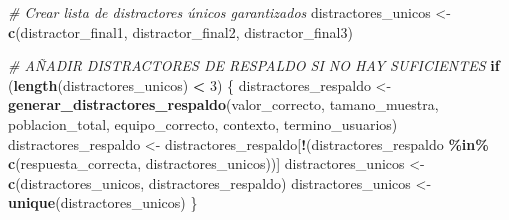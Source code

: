 \documentclass[
]{article}
\newenvironment{Shaded}{\begin{snugshade}}{\end{snugshade}}
\newcommand{\CommentTok}[1]{\textcolor[rgb]{0.56,0.35,0.01}{\textit{#1}}}
\newcommand{\ControlFlowTok}[1]{\textcolor[rgb]{0.13,0.29,0.53}{\textbf{#1}}}
\newcommand{\DecValTok}[1]{\textcolor[rgb]{0.00,0.00,0.81}{#1}}
\newcommand{\FunctionTok}[1]{\textcolor[rgb]{0.13,0.29,0.53}{\textbf{#1}}}
\newcommand{\NormalTok}[1]{#1}
\newcommand{\OtherTok}[1]{\textcolor[rgb]{0.56,0.35,0.01}{#1}}
\newcommand{\SpecialCharTok}[1]{\textcolor[rgb]{0.81,0.36,0.00}{\textbf{#1}}}
\begin{document}
\begin{Shaded}
\begin{Highlighting}[]
\CommentTok{\# Crear lista de distractores únicos garantizados}
\NormalTok{distractores\_unicos }\OtherTok{\textless{}{-}} \FunctionTok{c}\NormalTok{(distractor\_final1, distractor\_final2, distractor\_final3)}

\CommentTok{\# AÑADIR DISTRACTORES DE RESPALDO SI NO HAY SUFICIENTES}
\ControlFlowTok{if}\NormalTok{ (}\FunctionTok{length}\NormalTok{(distractores\_unicos) }\SpecialCharTok{\textless{}} \DecValTok{3}\NormalTok{) \{}
\NormalTok{  distractores\_respaldo }\OtherTok{\textless{}{-}} \FunctionTok{generar\_distractores\_respaldo}\NormalTok{(valor\_correcto, tamano\_muestra, poblacion\_total,}
\NormalTok{                                                        equipo\_correcto, contexto, termino\_usuarios)}
\NormalTok{  distractores\_respaldo }\OtherTok{\textless{}{-}}\NormalTok{ distractores\_respaldo[}\SpecialCharTok{!}\NormalTok{(distractores\_respaldo }\SpecialCharTok{\%in\%} \FunctionTok{c}\NormalTok{(respuesta\_correcta, distractores\_unicos))]}
\NormalTok{  distractores\_unicos }\OtherTok{\textless{}{-}} \FunctionTok{c}\NormalTok{(distractores\_unicos, distractores\_respaldo)}
\NormalTok{  distractores\_unicos }\OtherTok{\textless{}{-}} \FunctionTok{unique}\NormalTok{(distractores\_unicos)}
\NormalTok{\}}


\end{Highlighting}
\end{Shaded}
\end{document}

